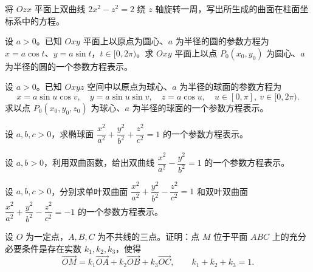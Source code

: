 \noindent\begin{minipage}{\textwidth}
将 $Ozx$ 平面上双曲线 $2x^2-z^2=2$ 绕 $z$ 轴旋转一周，写出所生成的曲面在柱面坐标系中的方程。
\end{minipage}\par\vfill
\noindent\begin{minipage}{\textwidth}
设 $a>0$。已知 $Oxy$ 平面上以原点为圆心、$a$ 为半径的圆的参数方程为 $x=a\cos t$、$y=a\sin t$，$t\in[0,2\pi)$。求 $Oxy$ 平面上以点 $P_0(x_0,y_0)$ 为圆心、$a$ 为半径的圆的一个参数方程表示。
\end{minipage}\par\vfill
\newpage
\noindent\begin{minipage}{\textwidth}
设 $a>0$。已知 $Oxyz$ 空间中以原点为球心、$a$ 为半径的球面的参数方程为 \[x=a\sin u\cos v,\quad y=a\sin u\sin v,\quad z=a\cos u,\quad u\in[0,\pi],\ v\in[0,2\pi).\] 求以点 $P_0(x_0,y_0,z_0)$ 为球心、$a$ 为半径的球面的一个参数方程表示。
\end{minipage}\par\vfill
\noindent\begin{minipage}{\textwidth}
设 $a,b,c>0$，求椭球面 $\dfrac{x^2}{a^2}+\dfrac{y^2}{b^2}+\dfrac{z^2}{c^2}=1$ 的一个参数方程表示。
\end{minipage}\par\vfill
\noindent\begin{minipage}{\textwidth}
设 $a,b>0$，利用双曲函数，给出双曲线 $\dfrac{x^2}{a^2}-\dfrac{y^2}{b^2}=1$ 的一个参数方程表示。
\end{minipage}\par\vfill
\noindent\begin{minipage}{\textwidth}
设 $a,b,c>0$，分别求单叶双曲面 $\dfrac{x^2}{a^2}+\dfrac{y^2}{b^2}-\dfrac{z^2}{c^2}=1$ 和双叶双曲面 $\dfrac{x^2}{a^2}+\dfrac{y^2}{b^2}-\dfrac{z^2}{c^2}=-1$ 的一个参数方程表示。
\end{minipage}\par\vfill
\newpage
\noindent\begin{minipage}{\textwidth}
设 $O$ 为一定点，$A,B,C$ 为不共线的三点。证明：点 $M$ 位于平面 $ABC$ 上的充分必要条件是存在实数 $k_1,k_2,k_3$，使得 \[\overrightarrow{OM}=k_1\overrightarrow{OA}+k_2\overrightarrow{OB}+k_3\overrightarrow{OC},\qquad k_1+k_2+k_3=1.\]
\end{minipage}\par\vfill
